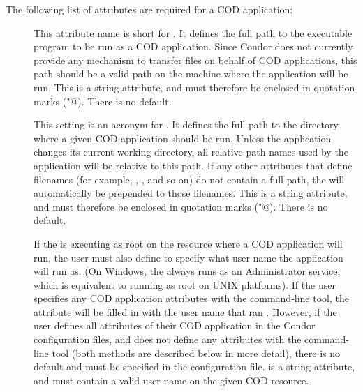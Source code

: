 
The following list of attributes are required for a COD application:

\begin{description}

 \item[] This attribute name is short for .
   It defines the full path to the executable program to be run as a
   COD application.
   Since Condor does not currently provide any mechanism to transfer
   files on behalf of COD applications, this path should be a valid
   path on the machine where the application will be run.
   This is a string attribute, and must therefore be enclosed in
   quotation marks (\verb@"@).
   There is no default.

 \item[] This setting is an acronym for .
   It defines the full path to the directory where a given COD
   application should be run.
   Unless the application changes its current working directory, all
   relative path names used by the application will be relative to
   this path.
   If any other attributes that define filenames (for example,
   , , and so on) do not contain a full path, the
    will automatically be prepended to those filenames.
   This is a string attribute, and must therefore be enclosed in 
   quotation marks (\verb@"@).
   There is no default.

 \item[] If the  is executing as root on
   the resource where a COD application will run, the user must also
   define  to specify what user name the application will
   run as.
   (On Windows, the  always runs as an Administrator
   service, which is equivalent to running as root on UNIX platforms).
   If the user specifies any COD application attributes with the
    command-line tool, the 
   attribute will be filled in with the user name that ran
   .
   However, if the user defines all attributes of their COD
   application in the Condor configuration files, and does not define
   any attributes with the  command-line tool
   (both methods are described below in more detail), there is no
   default and  must be specified in the configuration
   file.
    is a string attribute, and must contain a valid user
   name on the given COD resource. 

\end{description}


